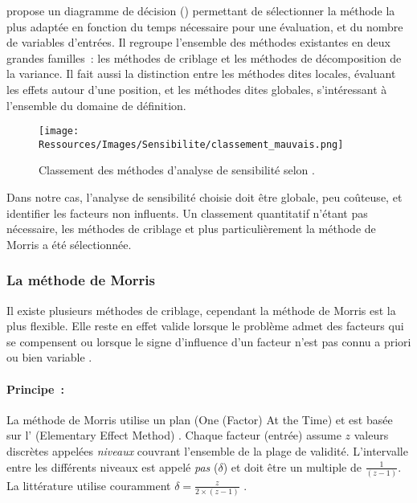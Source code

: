 \textcite{Iooss2011} propose un diagramme de décision ()
permettant de sélectionner la méthode la plus adaptée en fonction du temps nécessaire pour
une évaluation, et du nombre de variables d’entrées. Il regroupe l’ensemble
des méthodes existantes en deux grandes familles~: les méthodes de criblage et les méthodes
de décomposition de la variance. Il fait aussi la distinction entre les
méthodes dites locales, évaluant les effets autour d’une position, et les méthodes
dites globales, s’intéressant à l’ensemble du domaine de définition.

\begin{figure}
    \centering
    \texttt{[image: Ressources/Images/Sensibilite/classement\_mauvais.png]}
    \caption[Classement des méthodes d’analyse de sensibilité selon \cite{Iooss2011}]
            {Classement des méthodes d’analyse de sensibilité selon \cite{Iooss2011}.}
    \label{fig:classement_methode_sensibilite}
\end{figure}

Dans notre cas, l’analyse de sensibilité choisie doit être globale, peu coûteuse,
et identifier les facteurs non influents. Un classement quantitatif n’étant pas
nécessaire, les méthodes de criblage et plus particulièrement la méthode de Morris
a été sélectionnée.



\subsubsection{La méthode de Morris} %
\label{ssub:la_methode_de_morris}
Il existe plusieurs méthodes de criblage, cependant la méthode de Morris \parencite{Morris1991161}
est la plus flexible. Elle reste en effet valide lorsque le problème admet des facteurs
qui se compensent ou lorsque le signe d’influence d’un facteur n’est pas connu a priori
ou bien variable \parencite{Saltelli2004}.

\paragraph{Principe~:} %
\label{par:principe}
La méthode de Morris utilise un plan  (One (Factor) At the Time) et est basée
sur l’ (Elementary Effect Method) \parencite{Saltelli2004}. Chaque facteur
(entrée) assume $z$ valeurs discrètes appelées \textit{niveaux} couvrant l’ensemble de la
plage de validité. L’intervalle entre les différents niveaux est appelé \textit{pas}
($\delta$) et doit être un multiple de $\frac{1}{(z - 1)}$. La littérature utilise
couramment $\delta = \frac{z}{2 \times (z - 1)}$ \parencite{Morris1991161, Campolongo20071509}.

